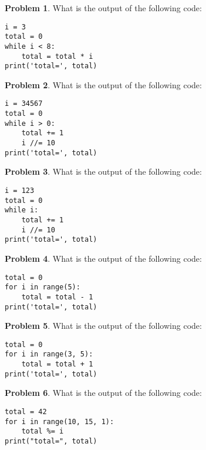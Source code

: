 \documentclass[10pt]{article}
\theoremstyle{definition}
\newtheorem{problem}{Problem}
\begin{document}
\begin{problem}
    What is the output of the following code:
\end{problem}
\begin{lstlisting}
i = 3
total = 0
while i < 8:
    total = total * i
print('total=', total)
\end{lstlisting}
\vspace{1.8in}


\begin{problem}
    What is the output of the following code:
\end{problem}
\begin{lstlisting}
i = 34567
total = 0
while i > 0:
    total += 1
    i //= 10
print('total=', total)
\end{lstlisting}
\vspace{1.8in}


\begin{problem}
    What is the output of the following code:
\end{problem}
\begin{lstlisting}
i = 123
total = 0
while i:
    total += 1
    i //= 10
print('total=', total)
\end{lstlisting}
\vspace{1.8in}


\begin{problem}
    What is the output of the following code:
\end{problem}
\begin{lstlisting}
total = 0
for i in range(5):
    total = total - 1
print('total=', total)
\end{lstlisting}
\vspace{2in}

\begin{problem}
    What is the output of the following code:
\end{problem}
\begin{lstlisting}
total = 0
for i in range(3, 5):
    total = total + 1
print('total=', total)
\end{lstlisting}
\vspace{2in}



\begin{problem}
    What is the output of the following code:
\end{problem}
\begin{lstlisting}
total = 42
for i in range(10, 15, 1):
    total %= i
print("total=", total)
\end{lstlisting}
\vspace{2in}
\end{document}

